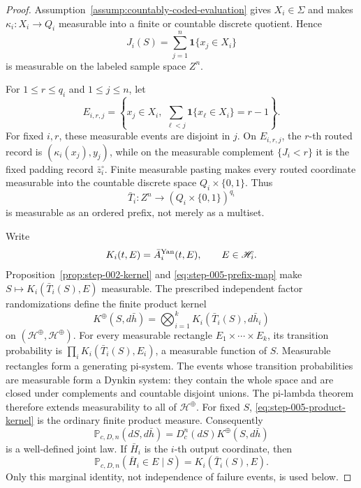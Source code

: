 \begin{proof}
Assumption~\ref{assump:countably-coded-evaluation} gives \(X_i\in\Sigma\)
and makes \(\kappa_i:X_i\to Q_i\) measurable into a finite or countable
discrete quotient.  Hence
\begin{equation}\label{eq:step-005-count-measurable}
J_i(S)=\sum_{j=1}^n\mathbf1\{x_j\in X_i\}
\end{equation}
is measurable on the labeled sample space \(Z^n\).

For \(1\le r\le q_i\) and \(1\le j\le n\), let
\begin{equation}\label{eq:step-005-position-events}
E_{i,r,j}=
\left\{x_j\in X_i,\ 
\sum_{\ell<j}\mathbf1\{x_\ell\in X_i\}=r-1\right\}.
\end{equation}
For fixed \(i,r\), these measurable events are disjoint in \(j\).  On
\(E_{i,r,j}\), the \(r\)-th routed record is
\((\kappa_i(x_j),y_j)\), while on the measurable complement
\(\{J_i<r\}\) it is the fixed padding record \(\bar z_i^\circ\).
Finite measurable pasting makes every routed coordinate measurable into
the countable discrete space \(Q_i\times\{0,1\}\).  Thus
\begin{equation}\label{eq:step-005-prefix-map}
\bar T_i:Z^n\longrightarrow(Q_i\times\{0,1\})^{q_i}
\end{equation}
is measurable as an ordered prefix, not merely as a multiset.

Write
\begin{equation}\label{eq:step-005-factor-kernel}
K_i(t,E)=\bar A_i^{\rm Yan}(t,E),\qquad E\in\mathscr H_i.
\end{equation}
Proposition~\ref{prop:step-002-kernel} and
\eqref{eq:step-005-prefix-map} make
\(S\mapsto K_i(\bar T_i(S),E)\) measurable.  The prescribed independent
factor randomizations define the finite product kernel
\begin{equation}\label{eq:step-005-product-kernel}
K^\oplus(S,d\bar h)
=\bigotimes_{i=1}^kK_i(\bar T_i(S),d\bar h_i)
\end{equation}
on \((\mathcal H^\oplus,\mathscr H^\oplus)\).  For every measurable
rectangle \(E_1\times\cdots\times E_k\), its transition probability is
\(\prod_iK_i(\bar T_i(S),E_i)\), a measurable function of \(S\).
Measurable rectangles form a generating pi-system.  The events whose
transition probabilities are measurable form a Dynkin system: they
contain the whole space and are closed under complements and countable
disjoint unions.  The pi-lambda theorem therefore extends measurability to
all of \(\mathscr H^\oplus\).  For fixed \(S\),
\eqref{eq:step-005-product-kernel} is the ordinary finite product measure.
Consequently
\begin{equation}\label{eq:step-005-joint-law}
\mathbb P_{c,D,n}(dS,d\bar h)
=D_c^n(dS)K^\oplus(S,d\bar h)
\end{equation}
is a well-defined joint law.  If \(\bar H_i\) is the \(i\)-th output
coordinate, then
\begin{equation}\label{eq:step-005-conditional-marginal}
\mathbb P_{c,D,n}(\bar H_i\in E\mid S)
=K_i(\bar T_i(S),E).
\end{equation}
Only this marginal identity, not independence of failure events, is used
below.


\end{proof}
